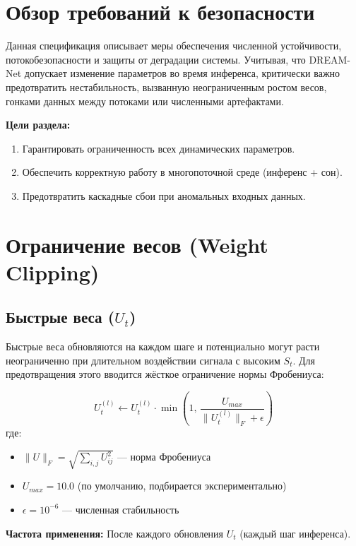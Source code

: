 \section{Обзор требований к безопасности}

Данная спецификация описывает меры обеспечения численной устойчивости, потокобезопасности и защиты от деградации системы. Учитывая, что DREAM-Net допускает изменение параметров во время инференса, критически важно предотвратить нестабильность, вызванную неограниченным ростом весов, гонками данных между потоками или численными артефактами.

\textbf{Цели раздела:}
\begin{enumerate}
    \item Гарантировать ограниченность всех динамических параметров.
    \item Обеспечить корректную работу в многопоточной среде (инференс + сон).
    \item Предотвратить каскадные сбои при аномальных входных данных.
\end{enumerate}

\section{Ограничение весов (Weight Clipping)}

\subsection{Быстрые веса ($U_t$)}

Быстрые веса обновляются на каждом шаге и потенциально могут расти неограниченно при длительном воздействии сигнала с высоким $S_t$. Для предотвращения этого вводится жёсткое ограничение нормы Фробениуса:

\begin{equation}
U_t^{(l)} \leftarrow U_t^{(l)} \cdot \min\left(1, \, \frac{U_{max}}{\|U_t^{(l)}\|_F + \epsilon}\right)
\label{eq:weight_clipping}
\end{equation}
где:
\begin{itemize}
    \item $\|U\|_F = \sqrt{\sum_{i,j} U_{ij}^2}$ — норма Фробениуса
    \item $U_{max} = 10.0$ (по умолчанию, подбирается экспериментально)
    \item $\epsilon = 10^{-6}$ — численная стабильность
\end{itemize}

\textbf{Частота применения:} После каждого обновления $U_t$ (каждый шаг инференса).

